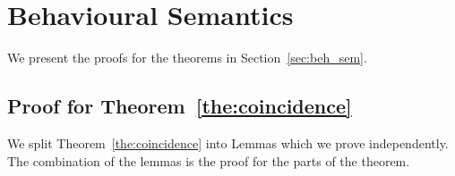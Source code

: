 \section{Behavioural Semantics}

We present the proofs for the theorems in
Section~\ref{sec:beh_sem}.

\subsection{Proof for Theorem~\ref{the:coincidence}}
\label{app:sub_coinc}

We split Theorem~\ref{the:coincidence} into 
Lemmas which we prove independently.
The combination of the lemmas is the proof for the parts
of the theorem.

\begin{comment}


We develop an auxiliary lemma used to prove
the requirements of Theorem~\ref{the:coincidence}.

\begin{lemma}\rm
	\label{lem:aux}
	$\Gamma; \emptyset; \Delta_1 \by{\bactout{s}{(x) P}} \Delta_2 \proves P_1 \by{\bactout{s}{(x) P}} P_2$
	implies that $\exists s'$ such that $\Gamma; \emptyset; \Delta_1 \cat s': S \proves P_2 \Par P \subst{s'}{x}$
\end{lemma}

\begin{proof}

	\noi We do an induction on the labelled transition system
	derivation for action $\bactout{s}{(x) P}$.
	{\bf Basic Step: }

	\[
		\bout{s}{(x) P} P_2 \by{\bactout{s}{(x) P}} P_2
	\]
	\noi and
	\[
		\Gamma; \emptyset; \Delta_1 \proves \bout{s}{(x) P} P_2 \hastype \Proc
	\]
	\noi Type rule $\trule{Send}$ implies
	\begin{eqnarray}
		\Gamma; \emptyset; \Delta_1' &\proves& P_2 \hastype \Proc \label{lem:aux1}\\
		\Gamma; \emptyset; \Delta_1'' &\proves& (x) P \hastype U \label{lem:aux2} \\
		\Delta_1 &=& (\Delta_1' \cup \Delta_1'')\backslash s \cup \set{s: \btout{U} S}
	\end{eqnarray}
	\noi Rule $\trule{Abs}$ implies that from~\ref{lem:aux2} we get
	\begin{eqnarray*}
		\Gamma; \emptyset; \Delta_1'' \cat x: S' \proves P \hastype \Proc
	\end{eqnarray*}
	\noi we apply the Substitution Lemma~\ref{aaa} to get that for fresh $s'$
	\begin{eqnarray*}
		\Gamma; \emptyset; \Delta_1'' \cat s': S' \proves P\subst{s'}{x} \hastype \Proc
	\end{eqnarray*}
	\noi Finally we apply rule $\trule{Par}$ to~\ref{lem:aux1} and the latter judgement to get
	\begin{eqnarray*}
		\Gamma; \emptyset; \Delta_1' \cup \Delta_1'' \cat s': S' \proves P_2 \Par P\subst{s'}{x} \hastype \Proc
	\end{eqnarray*}


\end{comment}

